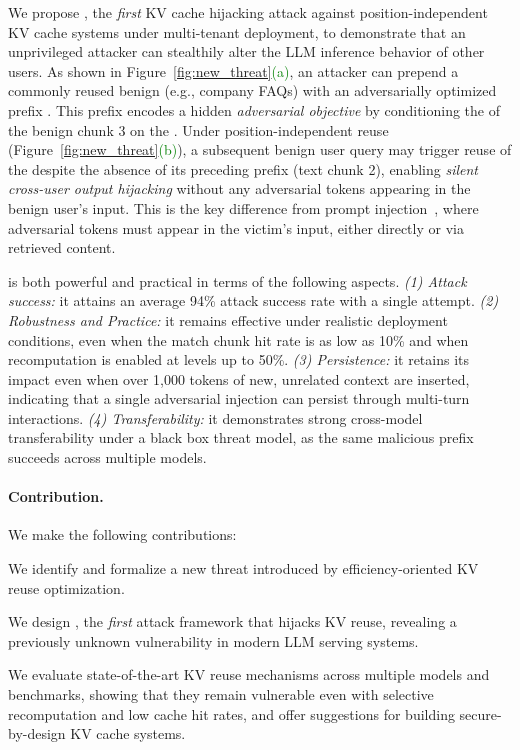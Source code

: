 We propose \sys, the \emph{first} KV cache hijacking attack against position-independent KV cache systems under multi-tenant deployment, to demonstrate that an unprivileged attacker can stealthily alter the LLM inference behavior of other users.
As shown in {Figure~\ref{fig:new_threat}\textcolor{Green}{(a)}}, an attacker can prepend a \textcolor{blue!70!black}{commonly reused benign}  (e.g., company FAQs) with an \textcolor{red!70!black}{adversarially optimized prefix}  . This prefix encodes a hidden \emph{adversarial objective} by \textcolor{red!70!black}{conditioning the}  of the benign chunk 3 on the .
Under position-independent reuse ({Figure~\ref{fig:new_threat}\textcolor{Green}{(b)}}), a subsequent benign user query may trigger \textcolor{red!70!black}{reuse of the}  despite the absence of its preceding prefix (text chunk 2), enabling \emph{silent cross-user output hijacking} without any adversarial tokens appearing in the benign user's input.
% 
This is the key difference from prompt injection~\cite{liu2024formalizing}, where adversarial tokens must appear in the victim's input, either directly or via retrieved content.

\sys is both powerful and practical in terms of the following aspects. \emph{(1) Attack success:} it attains an average 94\% attack success rate with a single attempt. \emph{(2) Robustness and Practice:} it remains effective under realistic deployment conditions, even when the match chunk hit rate is as low as 10\% and when recomputation is enabled at levels up to 50\%. \emph{(3) Persistence:} it retains its impact even when over 1,000 tokens of new, unrelated context are inserted, indicating that a single adversarial injection can persist through multi-turn interactions. \emph{(4) Transferability:} it demonstrates strong cross-model transferability under a black box threat model, as the same malicious prefix succeeds across multiple models. 


\paragraph{Contribution.} We make the following contributions:
\begin{icompact}
    \item We identify and formalize a new threat introduced by efficiency-oriented KV reuse optimization.
    \item We design \sys, the \emph{first} attack framework that hijacks KV reuse, revealing a previously unknown vulnerability in modern LLM serving systems.
    \item We evaluate state-of-the-art KV reuse mechanisms across multiple models and benchmarks, showing that they remain vulnerable even with selective recomputation and low cache hit rates, and offer suggestions for building secure-by-design KV cache systems.
\end{icompact}